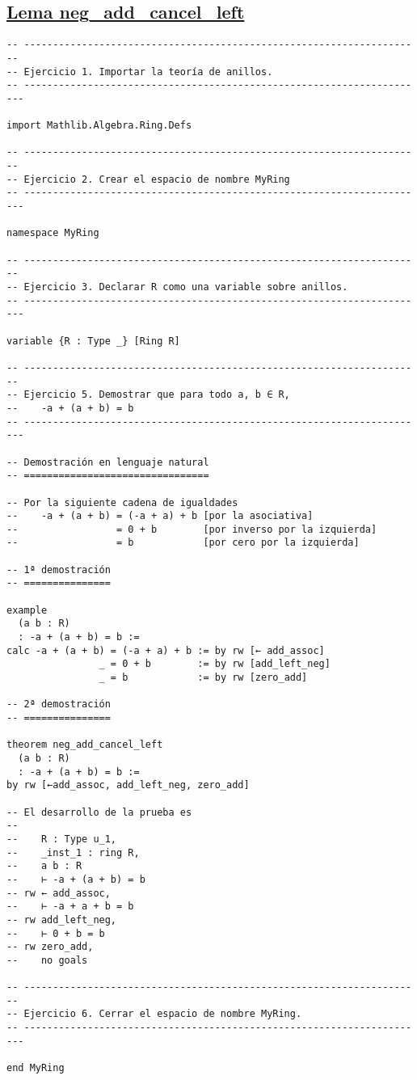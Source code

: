 \subsection{\href{./src/Basicos/neg\_add\_cancel\_left.lean}{Lema neg\_add\_cancel\_left}}
\label{sec:org88b921f}
\begin{verbatim}
-- ---------------------------------------------------------------------
-- Ejercicio 1. Importar la teoría de anillos.
-- ----------------------------------------------------------------------

import Mathlib.Algebra.Ring.Defs

-- ---------------------------------------------------------------------
-- Ejercicio 2. Crear el espacio de nombre MyRing
-- ----------------------------------------------------------------------

namespace MyRing

-- ---------------------------------------------------------------------
-- Ejercicio 3. Declarar R como una variable sobre anillos.
-- ----------------------------------------------------------------------

variable {R : Type _} [Ring R]

-- ---------------------------------------------------------------------
-- Ejercicio 5. Demostrar que para todo a, b ∈ R,
--    -a + (a + b) = b
-- ----------------------------------------------------------------------

-- Demostración en lenguaje natural
-- ================================

-- Por la siguiente cadena de igualdades
--    -a + (a + b) = (-a + a) + b [por la asociativa]
--                 = 0 + b        [por inverso por la izquierda]
--                 = b            [por cero por la izquierda]

-- 1ª demostración
-- ===============

example
  (a b : R)
  : -a + (a + b) = b :=
calc -a + (a + b) = (-a + a) + b := by rw [← add_assoc]
                _ = 0 + b        := by rw [add_left_neg]
                _ = b            := by rw [zero_add]

-- 2ª demostración
-- ===============

theorem neg_add_cancel_left
  (a b : R)
  : -a + (a + b) = b :=
by rw [←add_assoc, add_left_neg, zero_add]

-- El desarrollo de la prueba es
--
--    R : Type u_1,
--    _inst_1 : ring R,
--    a b : R
--    ⊢ -a + (a + b) = b
-- rw ← add_assoc,
--    ⊢ -a + a + b = b
-- rw add_left_neg,
--    ⊢ 0 + b = b
-- rw zero_add,
--    no goals

-- ---------------------------------------------------------------------
-- Ejercicio 6. Cerrar el espacio de nombre MyRing.
-- ----------------------------------------------------------------------

end MyRing
\end{verbatim}

